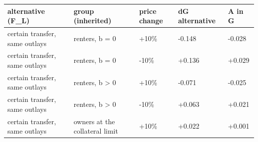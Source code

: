 \begingroup\small
\setlength{\tabcolsep}{3pt}
\renewcommand{\arraystretch}{1.04}
\begin{tabularx}{\linewidth}{XXXXX}
\toprule
alternative (F\_L) & group (inherited) & price change & dG alternative & A in G \\
\midrule
certain transfer, same outlays & renters, b = 0 & +10\% & -0.148 & -0.028 \\
certain transfer, same outlays & renters, b = 0 & -10\% & +0.136 & +0.029 \\
certain transfer, same outlays & renters, b \textgreater{} 0 & +10\% & -0.071 & -0.025 \\
certain transfer, same outlays & renters, b \textgreater{} 0 & -10\% & +0.063 & +0.021 \\
certain transfer, same outlays & owners at the collateral limit & +10\% & +0.022 & +0.001 \\
\bottomrule
\end{tabularx}
\endgroup
